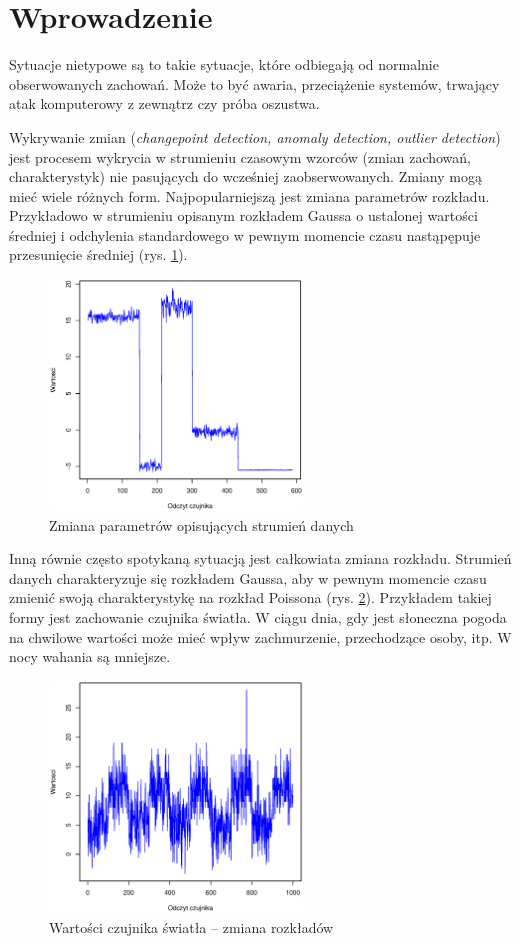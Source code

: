 \section{Wprowadzenie}

Sytuacje nietypowe są to takie sytuacje,
które odbiegają od normalnie obserwowanych zachowań.
Może to być awaria, przeciążenie systemów,
trwający atak komputerowy z zewnątrz czy próba oszustwa.

Wykrywanie zmian (\textit{changepoint detection, anomaly detection, outlier detection}) jest procesem
wykrycia w strumieniu czasowym wzorców (zmian zachowań, charakterystyk) nie pasujących do wcześniej zaobserwowanych.
Zmiany mogą mieć wiele różnych form.
Najpopularniejszą jest zmiana parametrów rozkładu.
Przykładowo w strumieniu opisanym rozkładem Gaussa o ustalonej wartości średniej i odchylenia standardowego
w pewnym momencie czasu nastąpępuje przesunięcie średniej (rys. \ref{fig:SignalData}).
\begin{figure}[htbp]
\centering
	\includegraphics[width=0.6\textwidth]{img/ch-2-data}
	\caption{Zmiana parametrów opisujących strumień danych}
  \label{fig:SignalData}
\end{figure}
Inną równie często spotykaną sytuacją jest całkowiata zmiana rozkładu.
Strumień danych charakteryzuje się rozkładem Gaussa,
aby w pewnym momencie czasu zmienić swoją charakterystykę na rozkład Poissona (rys. \ref{fig:SignalDist}).
Przykładem takiej formy jest zachowanie czujnika światła.
W ciągu dnia, gdy jest słoneczna pogoda na chwilowe wartości może mieć wpływ zachmurzenie, przechodzące osoby, itp.
W nocy wahania są mniejsze.
\begin{figure}[htbp]
\centering
	\includegraphics[width=0.6\textwidth]{img/ch-2-dist}
	\caption{Wartości czujnika światła -- zmiana rozkładów}
  \label{fig:SignalDist}
\end{figure}


